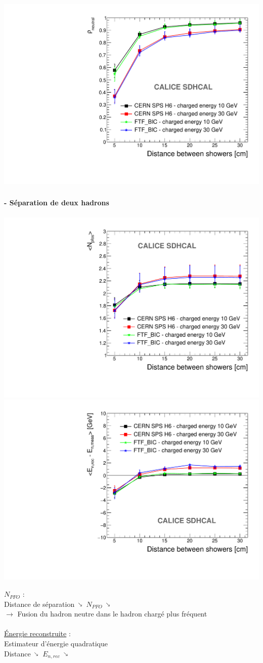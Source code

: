 \documentclass[8pt]{beamer}
\makeatletter
\newcommand{\fixed@sra}{$\vrule height 2\fontdimen22\textfont2 width 0pt\shortrightarrow$}
\newcommand{\shortarrow}[1]{%
  \mathrel{\text{\rotatebox[origin=c]{\numexpr#1*45}{\fixed@sra}}}
}
\makeatother
\begin{document}
\begin{frame}
\begin{minipage}{0.48\linewidth}
\begin{center}
        ~~~~~~~~~~~~\centering \includegraphics[width=0.8\linewidth]{OverlayEvent_Purity.pdf}
      \end{center}
    \end{minipage}
  \end{frame}

  \begin{frame}
  \frametitle{\secname}
  \framesubtitle{\subsecname - Séparation de deux hadrons}
    \begin{center}
      \includegraphics[width=0.49\linewidth]{OverlayEvent_NPfos.pdf}
      \includegraphics[width=0.49\linewidth]{OverlayEvent_EnergyDifference.pdf}
    \end{center}
    \underline{$N_{PFO}$} : \\
    Distance de séparation $\shortarrow{7}$ $N_{PFO}$ $\shortarrow{7}$ \\
    $\rightarrow$ Fusion du hadron neutre dans le hadron chargé plus fréquent \\
    ~ \\
    \underline{Énergie reconstruite} : \\
    Estimateur d'énergie quadratique \\
    Distance $\shortarrow{7}$ $E_{n,rec}$ $\shortarrow{7}$ \\
  \end{frame}
\end{document}
